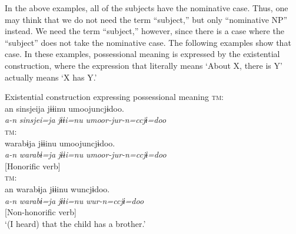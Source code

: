 In the above examples, all of the subjects have the nominative case. Thus, one may think that we do not need the term “subject,” but only “nominative NP” instead. We need the term “subject,” however, since there is a case where the “subject” does not take the nominative case. The following examples show that case. In these examples, possessional meaning is expressed by the existential construction, where the expression that literally means ‘About X, there is Y’ actually means ‘X has Y.’

{\smallex
\ea Existential construction expressing possessional meaning
\ea\label{ex:3.2a} {\textsc{tm}:} \hfill\relax[El: 120924] \\

\gllll   an  {sinsjeija}  {jɨɨinu}  {umoojuncjɨdoo.}\\
                 {\itshape a-n}  {\itshape sinsjei=ja}  {\itshape jɨɨi=nu}  {\itshape umoor-jur-n=ccjɨ=doo}\\
                 [{\textsc{dist}-\textsc{adn}Z}  {teacher]=\textsc{top}}  {brother=\textsc{nom}}  {[exist.\textsc{hon}-\textsc{umrk}-\textsc{ptcp}]=\textsc{qt}=\textsc{ass}}\\
                 {[Subject]} {} {}   {[Honorific verb]}\\
    \glt ‘(I heard) that the teacher has a brother.’\\\relax
         [lit. ‘(I heard) that about the teacher, there is a brother.’]
\ex\label{ex:3.2b} {\textsc{tm}:} \hfill\relax [El: 120924] \\

  {warabɨja}  {jɨɨinu}  {umoojuncjɨdoo.}\\
                   {\itshape a-n}  {\itshape warabɨ=ja}  {\itshape jɨɨi=nu}  {\itshape umoor-jur-n=ccjɨ=doo}\\
                   [{\textsc{dist}-\textsc{adn}Z}  {child]=\textsc{top}}  {brother=\textsc{nom}}  {[exist.\textsc{hon}-\textsc{umrk}-\textsc{ptcp}]=\textsc{qt}=\textsc{ass}}\\
                   [Subject]   {}   {}   {[Honorific verb]}\\
\ex \label{ex:3.2c} {\textsc{tm}:}\hfill\relax[El: 120924] \\

\gllll an  {warabɨja}  {jɨɨinu}  {wuncjɨdoo.}\\
   {\itshape a-n}  {\itshape warabɨ=ja}  {\itshape jɨɨi=nu}  {\itshape wur-n=ccjɨ=doo}\\
   [{\textsc{dist}-\textsc{adn}Z}  {child]=\textsc{top}}  {brother=\textsc{nom}}  {[exist-\textsc{ptcp}]=\textsc{qt}=\textsc{ass}}\\
   [Subject] {} {}     {[Non-honorific verb]}\\
   \glt ‘(I heard) that the child has a brother.’ \\\\
\z
\z} 

